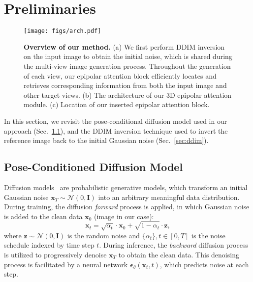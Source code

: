 \section{Preliminaries}
\label{sec:background}

\begin{figure*}[t]
    \vspace{-3mm}
    \centering
    \texttt{[image: figs/arch.pdf]}
    \vspace{-2mm}
    \caption{\textbf{Overview of our method.} 
    (a) We first perform DDIM inversion on the input image to obtain the initial noise, which is shared during the multi-view image generation process. Throughout the generation of each view, our epipolar attention block efficiently locates and retrieves corresponding information from both the input image and other target views.
    (b) The architecture of our 3D epipolar attention module.
    (c) Location of our inserted epipolar attention block.}
    \label{fig:arch}
    \vspace{-4mm}
\end{figure*}


In this section, we revisit the pose-conditional diffusion model used in our approach (Sec.~\ref{sec:pcdm}), and the DDIM inversion technique used to invert the reference image back to the initial Gaussian noise (Sec.~\ref{sec:ddim}).


\subsection{Pose-Conditioned Diffusion Model} \label{sec:pcdm}
Diffusion models~\cite{sohl2015deep, diffusion, ddim, dhariwal2021diffusion} are probabilistic generative models, which transform an initial Gaussian noise $\boldsymbol{x}_T \sim \mathcal{N}(0, \mathbf{I})$ into an arbitrary meaningful data distribution.
During training, the diffusion \textit{forward} process is applied, in which Gaussian noise is added to the clean data $\boldsymbol{x}_0$ (image in our case):
\begin{equation}
\label{eq:diffusion_forward}
    \boldsymbol{x}_t=\sqrt{\alpha_t} \cdot \boldsymbol{x}_0+\sqrt{1-\alpha_t} \cdot \boldsymbol{z},
\end{equation}
where $\boldsymbol{z} \sim \mathcal{N}(0, \mathbf{I})$ is the random noise and $\{\alpha_t\}, t \in [0, T]$ is the noise schedule indexed by time step $t$.
During inference, the \textit{backward} diffusion process is utilized to progressively denoise $\boldsymbol{x}_T$ to obtain the clean data. This denoising process is facilitated by a neural network $\boldsymbol{\epsilon}_\theta\left(\boldsymbol{x}_t, t\right)$, which predicts noise at each step.

